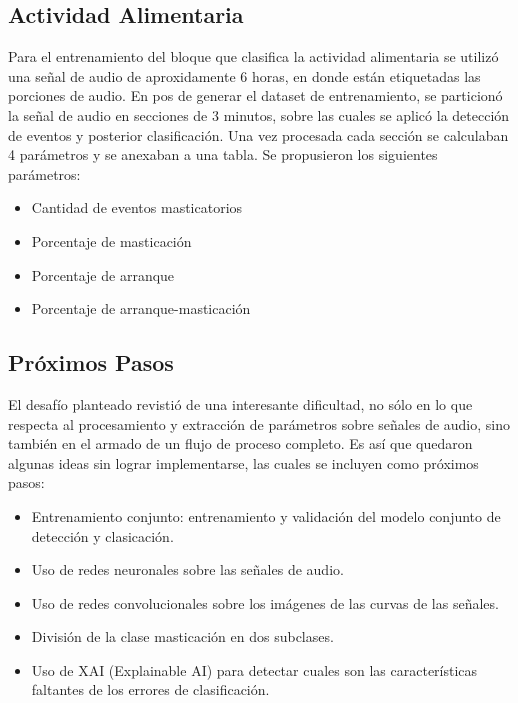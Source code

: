 \documentclass[11pt]{charter}
\begin{document}
\subsection{Actividad Alimentaria}
Para el entrenamiento del bloque que clasifica la actividad alimentaria se utilizó una señal de audio de aproxidamente 6 horas, en donde están etiquetadas las porciones de audio. 
En pos de generar el dataset de entrenamiento, se particionó la señal de audio en secciones de 3 minutos, sobre las cuales se aplicó la detección de eventos y posterior clasificación.
Una vez procesada cada sección se calculaban 4 parámetros y se anexaban a una tabla. Se propusieron los siguientes parámetros:

\begin{itemize}
	\item Cantidad de eventos masticatorios
	\item Porcentaje de masticación
	\item Porcentaje de arranque
	\item Porcentaje de arranque-masticación
\end{itemize}

\subsection{Próximos Pasos}
El desafío planteado revistió de una interesante dificultad, no sólo en lo que respecta al procesamiento y extracción de parámetros sobre señales de audio, sino también en el armado de un flujo de proceso completo. Es así que quedaron algunas ideas sin lograr implementarse, las cuales se incluyen como próximos pasos:
\begin{itemize}
	\item Entrenamiento conjunto: entrenamiento y validación del modelo conjunto de detección y clasicación.
	\item Uso de redes neuronales sobre las señales de audio.
	\item Uso de redes convolucionales sobre los imágenes de las curvas de las señales.
	\item División de la clase masticación en dos subclases.
	\item Uso de XAI (Explainable AI) para detectar cuales son las características faltantes de los errores de clasificación.
\end{itemize}
\end{document}
